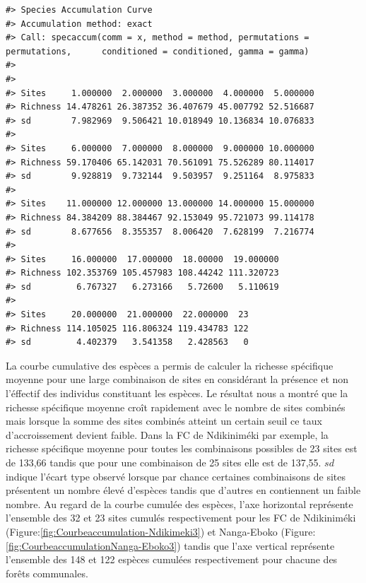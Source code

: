 \documentclass[
  12pt,
  a4paper,
  extrafontsizes,
  onecolumn,
  openright]{book}
\theoremstyle{definition}
\theoremstyle{definition}
\theoremstyle{definition}
\theoremstyle{definition}
\theoremstyle{remark}
\begin{document}
\begin{verbatim}
#> Species Accumulation Curve
#> Accumulation method: exact
#> Call: specaccum(comm = x, method = method, permutations = permutations,      conditioned = conditioned, gamma = gamma) 
#> 
#>                                                           
#> Sites     1.000000  2.000000  3.000000  4.000000  5.000000
#> Richness 14.478261 26.387352 36.407679 45.007792 52.516687
#> sd        7.982969  9.506421 10.018949 10.136834 10.076833
#>                                                           
#> Sites     6.000000  7.000000  8.000000  9.000000 10.000000
#> Richness 59.170406 65.142031 70.561091 75.526289 80.114017
#> sd        9.928819  9.732144  9.503957  9.251164  8.975833
#>                                                           
#> Sites    11.000000 12.000000 13.000000 14.000000 15.000000
#> Richness 84.384209 88.384467 92.153049 95.721073 99.114178
#> sd        8.677656  8.355357  8.006420  7.628199  7.216774
#>                                                    
#> Sites     16.000000  17.000000  18.00000  19.000000
#> Richness 102.353769 105.457983 108.44242 111.320723
#> sd         6.767327   6.273166   5.72600   5.110619
#>                                              
#> Sites     20.000000  21.000000  22.000000  23
#> Richness 114.105025 116.806324 119.434783 122
#> sd         4.402379   3.541358   2.428563   0
\end{verbatim}

La courbe cumulative des espèces a permis de calculer la richesse spécifique moyenne pour une large combinaison de sites en considérant la présence et non l'éffectif des individus constituant les espèces. Le résultat nous a montré que la richesse spécifique moyenne croît rapidement avec le nombre de sites combinés mais lorsque la somme des sites combinés atteint un certain seuil ce taux d'accroissement devient faible. Dans la FC de Ndikiniméki par exemple, la richesse spécifique moyenne pour toutes les combinaisons possibles de 23 sites est de 133,66 tandis que pour une combinaison de 25 sites elle est de 137,55. \(sd\) indique l'écart type observé lorsque par chance certaines combinaisons de sites présentent un nombre élevé d'espèces tandis que d'autres en contiennent un faible nombre. Au regard de la courbe cumulée des espèces, l'axe horizontal représente l'ensemble des 32 et 23 sites cumulés respectivement pour les FC de Ndikiniméki (Figure:\ref{fig:Courbeaccumulation-Ndikimeki3}) et Nanga-Eboko (Figure:\ref{fig:CourbeaccumulationNanga-Eboko3}) tandis que l'axe vertical représente l'ensemble des 148 et 122 espèces cumulées respectivement pour chacune des forêts communales.
\end{document}
